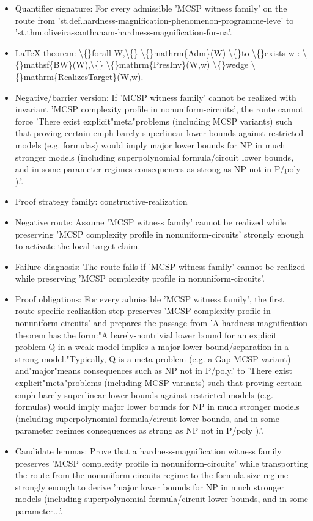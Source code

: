 \documentclass[11pt]{article}
\begin{document}
\begin{itemize}
\item Quantifier signature: For every admissible 'MCSP witness family' on the route from 'st.def.hardness-magnification-phenomenon-programme-leve' to 'st.thm.oliveira-santhanam-hardness-magnification-for-na'.
\item LaTeX theorem: \textbackslash\{\}forall W,\textbackslash\{\} \textbackslash\{\}mathrm\{Adm\}(W) \textbackslash\{\}to \textbackslash\{\}exists w : \textbackslash\{\}mathsf\{BW\}(W),\textbackslash\{\} \textbackslash\{\}mathrm\{PresInv\}(W,w) \textbackslash\{\}wedge \textbackslash\{\}mathrm\{RealizesTarget\}(W,w).
\item Negative/barrier version: If 'MCSP witness family' cannot be realized with invariant 'MCSP complexity profile in nonuniform-circuits', the route cannot force 'There exist explicit"meta"problems (including MCSP variants) such that proving certain emph barely-superlinear lower bounds against restricted models (e.g. formulas) would imply major lower bounds for NP in much stronger models (including superpolynomial formula/circuit lower bounds, and in some parameter regimes consequences as strong as NP not in P/poly ).'.
\item Proof strategy family: constructive-realization
\item Negative route: Assume 'MCSP witness family' cannot be realized while preserving 'MCSP complexity profile in nonuniform-circuits' strongly enough to activate the local target claim.
\item Failure diagnosis: The route fails if 'MCSP witness family' cannot be realized while preserving 'MCSP complexity profile in nonuniform-circuits'.
\item Proof obligations: For every admissible 'MCSP witness family', the first route-specific realization step preserves 'MCSP complexity profile in nonuniform-circuits' and prepares the passage from 'A hardness magnification theorem has the form:"A barely-nontrivial lower bound for an explicit problem Q in a weak model implies a major lower bound/separation in a strong model."Typically, Q is a meta-problem (e.g. a Gap-MCSP variant) and"major"means consequences such as NP not in P/poly.' to 'There exist explicit"meta"problems (including MCSP variants) such that proving certain emph barely-superlinear lower bounds against restricted models (e.g. formulas) would imply major lower bounds for NP in much stronger models (including superpolynomial formula/circuit lower bounds, and in some parameter regimes consequences as strong as NP not in P/poly ).'.
\item Candidate lemmas: Prove that a hardness-magnification witness family preserves 'MCSP complexity profile in nonuniform-circuits' while transporting the route from the nonuniform-circuits regime to the formula-size regime strongly enough to derive 'major lower bounds for NP in much stronger models (including superpolynomial formula/circuit lower bounds, and in some parameter...'.

\end{itemize}
\end{document}

